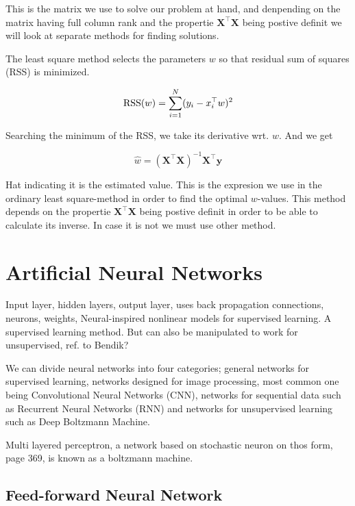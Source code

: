 This is the matrix we use to solve our problem at hand, and denpending on the matrix having full column rank and the propertie $\mathbf{X^{\top}}\mathbf{X}$ being postive definit we will look at separate methods for finding solutions.

The least square method selects the parameters $w$ so that residual sum of squares (RSS) is minimized.

\begin{equation}
\textnormal{RSS}(w) = \sum_{i=1}^{N} (y_i - x_i^{\top}w)^2
\end{equation}

Searching the minimum of the RSS, we take its derivative wrt. $w$. And we get

\begin{equation}
\hat{w} = (\mathbf{X}^{\top}\mathbf{X})^{-1}\mathbf{X}^{\top}\mathbf{y}
\end{equation}

Hat indicating it is the estimated value. 
This is the expresion we use in the ordinary least square-method in order to find the optimal $w$-values. This method depends on the propertie $\mathbf{X^{\top}}\mathbf{X}$ being postive definit in order to be able to calculate its inverse. In case it is not we must use other method.


\section{Artificial Neural Networks}

Input layer, hidden layers, output layer, uses back propagation
connections, neurons, weights, 
Neural-inspired nonlinear models for supervised learning. 
A supervised learning method. But can also be manipulated to work for unsupervised, ref. to Bendik? 

We can divide neural networks into four categories; general networks for supervised learning, networks designed for image processing, most common one being Convolutional Neural Networks (CNN), networks for sequential data such as Recurrent Neural Networks (RNN) and networks for unsupervised learning such as Deep Boltzmann Machine. 

Multi layered perceptron, a network based on stochastic neuron on thos form, page 369, is known as a boltzmann machine. 

\subsection{Feed-forward Neural Network}

